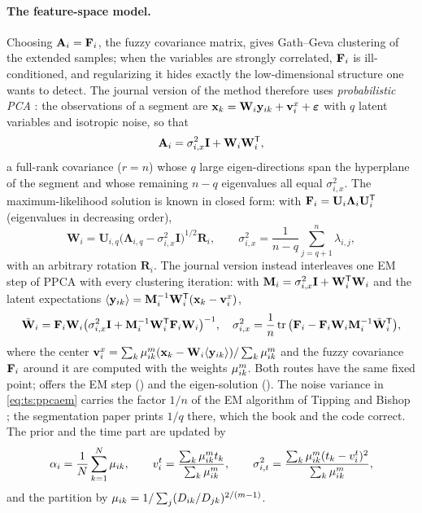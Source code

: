 \paragraph{The feature-space model.} Choosing $\mathbf{A}_i=\mathbf{F}_i$, the fuzzy covariance matrix, gives Gath--Geva clustering of the extended samples; when the variables are strongly correlated, $\mathbf{F}_i$ is ill-conditioned, and regularizing it \cite{babuska:2002:covariance} hides exactly the low-dimensional structure one wants to detect. The journal version of the method therefore uses \emph{probabilistic PCA} \cite{tipping:1999:ppca}: the observations of a segment are $\mathbf{x}_k=\mathbf{W}_i\mathbf{y}_{ik}+\mathbf{v}^x_i+\boldsymbol\varepsilon$ with $q$ latent variables and isotropic noise, so that
\begin{equation}
  \mathbf{A}_i=\sigma^2_{i,x}\mathbf{I}+\mathbf{W}_i\mathbf{W}_i^{\mathsf{T}},
  \label{eq:ts:ppcacov}
\end{equation}
a full-rank covariance ($r=n$) whose $q$ large eigen-directions span the hyperplane of the segment and whose remaining $n-q$ eigenvalues all equal $\sigma^2_{i,x}$. The maximum-likelihood solution is known in closed form: with $\mathbf{F}_i=\mathbf{U}_i\boldsymbol\Lambda_i\mathbf{U}_i^{\mathsf{T}}$ (eigenvalues in decreasing order),
\begin{equation}
  \mathbf{W}_i=\mathbf{U}_{i,q}\big(\boldsymbol\Lambda_{i,q}-\sigma^2_{i,x}\mathbf{I}\big)^{1/2}\mathbf{R}_i,\qquad
  \sigma^2_{i,x}=\frac{1}{n-q}\sum_{j=q+1}^{n}\lambda_{i,j},
  \label{eq:ts:ppcaml}
\end{equation}
with an arbitrary rotation $\mathbf{R}_i$. The journal version instead interleaves one EM step of PPCA with every clustering iteration: with $\mathbf{M}_i=\sigma^2_{i,x}\mathbf{I}+\mathbf{W}_i^{\mathsf{T}}\mathbf{W}_i$ and the latent expectations $\langle\mathbf{y}_{ik}\rangle=\mathbf{M}_i^{-1}\mathbf{W}_i^{\mathsf{T}}(\mathbf{x}_k-\mathbf{v}^x_i)$,
\begin{equation}
  \tilde{\mathbf{W}}_i=\mathbf{F}_i\mathbf{W}_i\big(\sigma^2_{i,x}\mathbf{I}+\mathbf{M}_i^{-1}\mathbf{W}_i^{\mathsf{T}}\mathbf{F}_i\mathbf{W}_i\big)^{-1},\quad
  \sigma^2_{i,x}=\frac1n\operatorname{tr}\big(\mathbf{F}_i-\mathbf{F}_i\mathbf{W}_i\mathbf{M}_i^{-1}\tilde{\mathbf{W}}_i^{\mathsf{T}}\big),
  \label{eq:ts:ppcaem}
\end{equation}
where the center $\mathbf{v}^x_i=\sum_k\mu_{ik}^m(\mathbf{x}_k-\mathbf{W}_i\langle\mathbf{y}_{ik}\rangle)/\sum_k\mu_{ik}^m$ and the fuzzy covariance $\mathbf{F}_i$ around it are computed with the weights $\mu_{ik}^m$. Both routes have the same fixed point;  offers the EM step () and the eigen-solution (). The noise variance in \eqref{eq:ts:ppcaem} carries the factor $1/n$ of the EM algorithm of Tipping and Bishop \cite{tipping:1999:ppca}; the segmentation paper prints $1/q$ there, which the book and the code correct. The prior and the time part are updated by
\begin{equation}
  \alpha_i=\frac1N\sum_{k=1}^{N}\mu_{ik},\qquad
  v^t_i=\frac{\sum_k\mu_{ik}^m t_k}{\sum_k\mu_{ik}^m},\qquad
  \sigma^2_{i,t}=\frac{\sum_k\mu_{ik}^m(t_k-v^t_i)^2}{\sum_k\mu_{ik}^m},
  \label{eq:ts:timeupdate}
\end{equation}
and the partition by $\mu_{ik}=1/\sum_j(D_{ik}/D_{jk})^{2/(m-1)}$.

